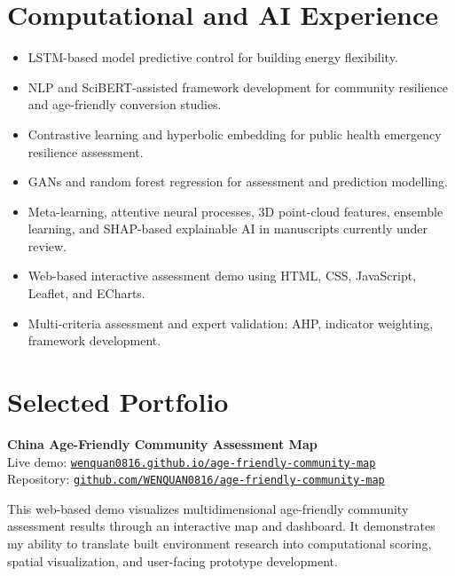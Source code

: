 \documentclass[11pt,a4paper]{article}
\begin{document}
\section*{Computational and AI Experience}
\begin{itemize}
  \item LSTM-based model predictive control for building energy flexibility.
  \item NLP and SciBERT-assisted framework development for community resilience and age-friendly conversion studies.
  \item Contrastive learning and hyperbolic embedding for public health emergency resilience assessment.
  \item GANs and random forest regression for assessment and prediction modelling.
  \item Meta-learning, attentive neural processes, 3D point-cloud features, ensemble learning, and SHAP-based explainable AI in manuscripts currently under review.
  \item Web-based interactive assessment demo using HTML, CSS, JavaScript, Leaflet, and ECharts.
  \item Multi-criteria assessment and expert validation: AHP, indicator weighting, framework development.
\end{itemize}

\section*{Selected Portfolio}
\textbf{China Age-Friendly Community Assessment Map}\\
Live demo: \href{https://wenquan0816.github.io/age-friendly-community-map/}{\nolinkurl{wenquan0816.github.io/age-friendly-community-map}}\\
Repository: \href{https://github.com/WENQUAN0816/age-friendly-community-map}{\nolinkurl{github.com/WENQUAN0816/age-friendly-community-map}}

This web-based demo visualizes multidimensional age-friendly community assessment results through an interactive map and dashboard. It demonstrates my ability to translate built environment research into computational scoring, spatial visualization, and user-facing prototype development.
\end{document}
